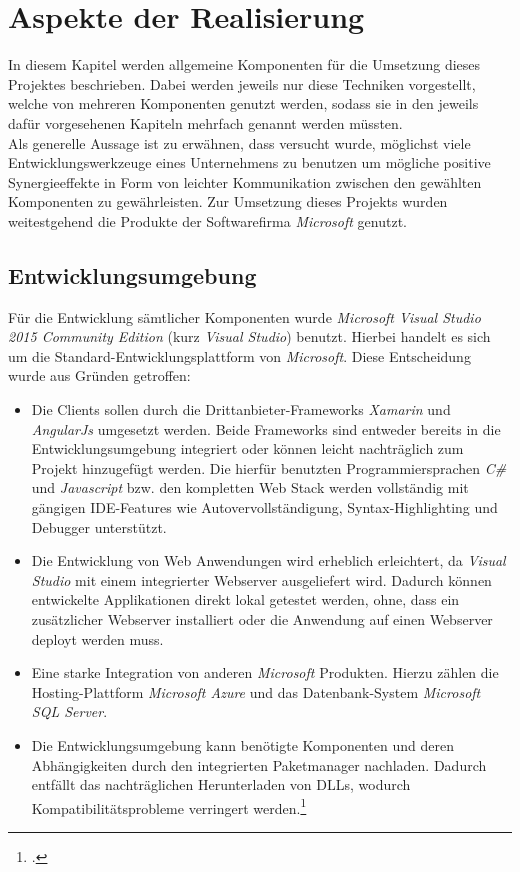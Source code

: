 \chapter{Aspekte der Realisierung}
\label{cha:realisierung}
In diesem Kapitel werden allgemeine Komponenten für die Umsetzung dieses Projektes beschrieben. Dabei werden jeweils nur diese Techniken vorgestellt, welche von mehreren Komponenten genutzt werden, sodass sie in den jeweils dafür vorgesehenen Kapiteln mehrfach genannt werden müssten. \\
Als generelle Aussage ist zu erwähnen, dass versucht wurde, möglichst viele Entwicklungswerkzeuge eines Unternehmens zu benutzen um mögliche positive Synergieeffekte in Form von leichter Kommunikation zwischen den gewählten Komponenten zu gewährleisten. Zur Umsetzung dieses Projekts wurden weitestgehend die Produkte der Softwarefirma \textit{Microsoft} genutzt.

\section{Entwicklungsumgebung}
\label{sec:entwicklungsumgebung}
Für die Entwicklung sämtlicher Komponenten wurde \textit{Microsoft Visual Studio 2015 Community Edition} (kurz \textit{Visual Studio}) benutzt. Hierbei handelt es sich um die Standard-Entwicklungsplattform von \textit{Microsoft}. Diese Entscheidung wurde aus Gründen getroffen:
\begin{itemize}
\item Die Clients sollen durch die Drittanbieter-Frameworks \textit{Xamarin} und \textit{AngularJs} umgesetzt werden. Beide Frameworks sind entweder bereits in die Entwicklungsumgebung integriert oder können leicht nachträglich zum Projekt hinzugefügt werden. Die hierfür benutzten Programmiersprachen \textit{C\#} und \textit{Javascript} bzw. den kompletten \ac{Web Stack} werden vollständig mit gängigen \ac{IDE}-Features wie Autovervollständigung, Syntax-Highlighting und Debugger unterstützt. 
\item Die Entwicklung von Web Anwendungen wird erheblich erleichtert, da \textit{Visual Studio} mit einem integrierter Webserver ausgeliefert wird. Dadurch können entwickelte Applikationen direkt lokal getestet werden, ohne, dass ein zusätzlicher Webserver installiert oder die Anwendung auf einen Webserver deployt werden muss.
\item Eine starke Integration von anderen \textit{Microsoft} Produkten. Hierzu zählen die Hosting-Plattform \textit{Microsoft Azure} und das Datenbank-System \textit{Microsoft SQL Server}.
\item Die Entwicklungsumgebung kann benötigte Komponenten und deren Abhängigkeiten durch den integrierten Paketmanager nachladen. Dadurch entfällt das nachträglichen Herunterladen von DLLs, wodurch Kompatibilitätsprobleme verringert werden.\footcite{online:VisualStudio}
\end{itemize}
